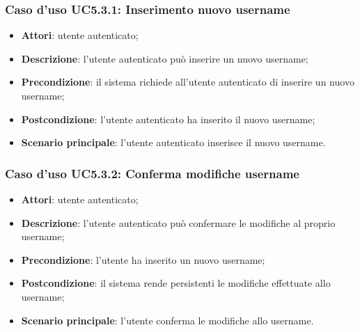 \subsubsection{Caso d'uso UC5.3.1: Inserimento nuovo username}

\begin{itemize}
	\item \textbf{Attori}: utente autenticato;
	\item \textbf{Descrizione}: l'utente autenticato può inserire un nuovo username;
	\item \textbf{Precondizione}: il sistema richiede all'utente autenticato di inserire un nuovo username;
	\item \textbf{Postcondizione}: l'utente autenticato ha inserito il nuovo username;
	\item \textbf{Scenario principale}: l'utente autenticato inserisce il nuovo username.
\end{itemize}

\subsubsection{Caso d'uso UC5.3.2: Conferma modifiche username}

\begin{itemize}
	\item \textbf{Attori}: utente autenticato;
	\item \textbf{Descrizione}: l'utente autenticato può confermare le modifiche al proprio username;
	\item \textbf{Precondizione}: l'utente ha inserito un nuovo username;
	\item \textbf{Postcondizione}: il sistema rende persistenti le modifiche effettuate allo username;
	\item \textbf{Scenario principale}: l'utente conferma le modifiche allo username.
\end{itemize}

